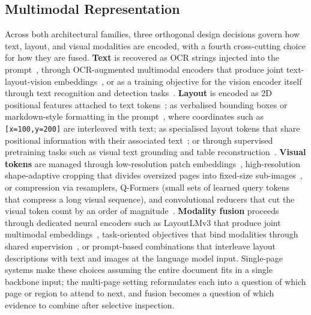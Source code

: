 \documentclass[11pt]{article}
\begin{document}
\subsection{Multimodal Representation}
\label{sec:bg-modality}

Across both architectural families, three orthogonal design decisions govern how text, layout, and visual modalities are encoded, with a fourth cross-cutting choice for how they are fused. \textbf{Text} is recovered as OCR strings injected into the prompt~\cite{wang2024docllm}, through OCR-augmented multimodal encoders that produce joint text-layout-vision embeddings~\cite{luo2024layoutllm,zhu2025enhancing}, or as a training objective for the vision encoder itself through text recognition and detection tasks~\cite{wang2025marten}. \textbf{Layout} is encoded as 2D positional features attached to text tokens~\cite{xu2020layoutlm,zhu2025enhancing}; as verbalised bounding boxes or markdown-style formatting in the prompt~\cite{perot2024lmdx}, where coordinates such as \texttt{[x=100,y=200]} are interleaved with text; as specialised layout tokens that share positional information with their associated text~\cite{zhu2025laytokenllm}; or through supervised pretraining tasks such as visual text grounding and table reconstruction~\cite{liu2024textmonkey}. \textbf{Visual tokens} are managed through low-resolution patch embeddings~\cite{tanaka2024instructdoc}, high-resolution shape-adaptive cropping that divides oversized pages into fixed-size sub-images~\cite{ye2023ureader,hu2024mplugdocowl}, or compression via resamplers, Q-Formers (small sets of learned query tokens that compress a long visual sequence), and convolutional reducers that cut the visual token count by an order of magnitude~\cite{hu2025mplugdocowl2,yu2024texthawk2,liu2024textmonkey}. \textbf{Modality fusion} proceeds through dedicated neural encoders such as LayoutLMv3 that produce joint multimodal embeddings~\cite{huang2022layoutlmv3,luo2024layoutllm}, task-oriented objectives that bind modalities through shared supervision~\cite{hu2024mplugdocowl,wang2025marten}, or prompt-based combinations that interleave layout descriptions with text and images at the language model input. Single-page systems make these choices assuming the entire document fits in a single backbone input; the multi-page setting reformulates each into a question of which page or region to attend to next, and fusion becomes a question of which evidence to combine after selective inspection.



\end{document}
